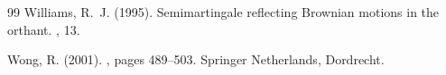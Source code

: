 \documentclass[11pt]{article}
\theoremstyle{definition}
\begin{document}
\begin{thebibliography}{99}
Williams, R.~J. (1995).
\newblock Semimartingale reflecting {Brownian} motions in the orthant.
, 13.


Wong, R. (2001).
, pages 489--503.
\newblock Springer Netherlands, Dordrecht.




\end{thebibliography}
\end{document}
